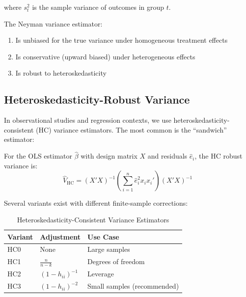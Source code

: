 where $s_t^2$ is the sample variance of outcomes in group $t$.

\begin{proposition}
\label{prop:neyman_properties}
The Neyman variance estimator:
\begin{enumerate}
    \item Is unbiased for the true variance under homogeneous treatment effects
    \item Is conservative (upward biased) under heterogeneous effects
    \item Is robust to heteroskedasticity
\end{enumerate}
\end{proposition}

\subsection{Heteroskedasticity-Robust Variance}

In observational studies and regression contexts, we use heteroskedasticity-consistent (HC) variance estimators. The most common is the ``sandwich'' estimator:

\begin{definition}
\label{def:hc_var}
For the OLS estimator $\hat{\beta}$ with design matrix $X$ and residuals $\hat{e}_i$, the HC robust variance is:
\begin{equation}
\hat{V}_{\text{HC}} = (X'X)^{-1} \left(\sum_{i=1}^{n} \hat{e}_i^2 x_i x_i'\right) (X'X)^{-1}
\label{eq:hc_var}
\end{equation}
\end{definition}

Several variants exist with different finite-sample corrections:

\begin{table}[ht]
\centering
\caption{Heteroskedasticity-Consistent Variance Estimators}
\label{tab:hc_variants}
\begin{tabular}{lll}
\toprule
\textbf{Variant} & \textbf{Adjustment} & \textbf{Use Case} \\
\midrule
HC0 & None & Large samples \\
HC1 & $\frac{n}{n-k}$ & Degrees of freedom \\
HC2 & $(1-h_{ii})^{-1}$ & Leverage \\
HC3 & $(1-h_{ii})^{-2}$ & Small samples (recommended) \\
\bottomrule
\end{tabular}
\end{table}

